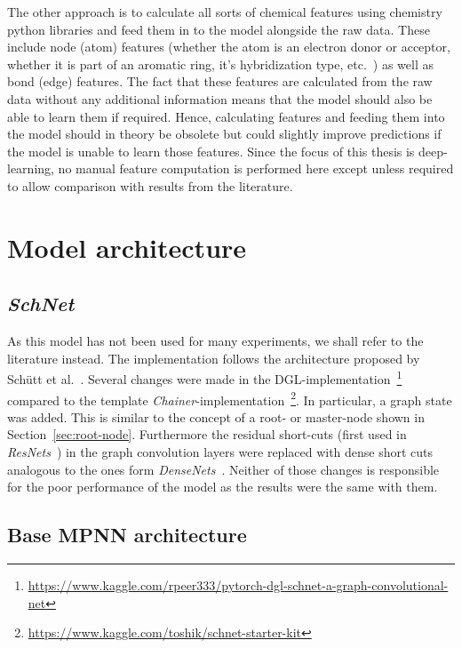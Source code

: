 The other approach is to calculate all sorts of chemical features using chemistry python libraries and feed them in to the model alongside the raw data. These include node (atom) features (whether the atom is an electron donor or acceptor, whether it is part of an aromatic ring, it's hybridization type, etc.~\cite{Organic-chemistry}) as well as bond (edge) features. The fact that these features are calculated from the raw data without any additional information means that the model should also be able to learn them if required. Hence, calculating features and feeding them into the model should in theory be obsolete but could slightly improve predictions if the model is unable to learn those features. Since the focus of this thesis is deep-learning, no manual feature computation is performed here except unless required to allow comparison with results from the literature.


\section{Model architecture}
\label{sec:architecture}

\subsection{\textit{SchNet}}
\label{sec:schnet-architecture}

As this model has not been used for many experiments, we shall refer to the literature instead. The implementation follows the architecture proposed by Schütt et al.~\cite{Schutt2017}. Several changes were made in the DGL-implementation~\footnote{\url{https://www.kaggle.com/rpeer333/pytorch-dgl-schnet-a-graph-convolutional-net}} compared to the template \textit{Chainer}-implementation~\footnote{\url{https://www.kaggle.com/toshik/schnet-starter-kit}}. In particular, a graph state was added. This is similar to the concept of a root- or master-node shown in Section~\ref{sec:root-node}. Furthermore the residual short-cuts (first used in \textit{ResNets}~\cite{Sun2016}) in the graph convolution layers were replaced with dense short cuts analogous to the ones form \textit{DenseNets}~\cite{Huang2017}. Neither of those changes is responsible for the poor performance of the model as the results were the same with them.


\subsection{Base MPNN architecture}
\label{sec:mpnn-architecture}

